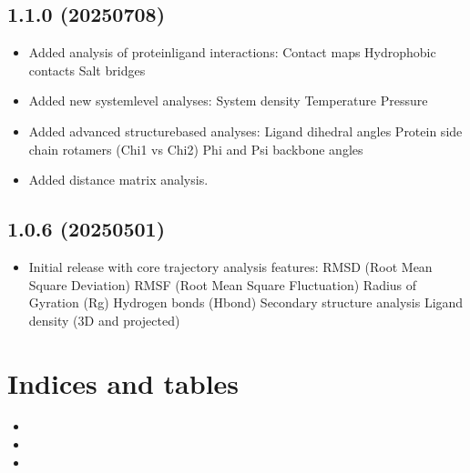 \documentclass[a4paper,10pt,english]{sphinxmanual}
\begin{document}
\section{1.1.0 (2025\sphinxhyphen{}07\sphinxhyphen{}08)}
\label{\detokenize{Changelog:id1}}\begin{itemize}
\item {} 
\sphinxAtStartPar
Added analysis of protein\sphinxhyphen{}ligand interactions:
\sphinxhyphen{} Contact maps
\sphinxhyphen{} Hydrophobic contacts
\sphinxhyphen{} Salt bridges

\item {} 
\sphinxAtStartPar
Added new system\sphinxhyphen{}level analyses:
\sphinxhyphen{} System density
\sphinxhyphen{} Temperature
\sphinxhyphen{} Pressure

\item {} 
\sphinxAtStartPar
Added advanced structure\sphinxhyphen{}based analyses:
\sphinxhyphen{} Ligand dihedral angles
\sphinxhyphen{} Protein side chain rotamers (Chi1 vs Chi2)
\sphinxhyphen{} Phi and Psi backbone angles

\item {} 
\sphinxAtStartPar
Added distance matrix analysis.

\end{itemize}


\section{1.0.6 (2025\sphinxhyphen{}05\sphinxhyphen{}01)}
\label{\detokenize{Changelog:id2}}\begin{itemize}
\item {} 
\sphinxAtStartPar
Initial release with core trajectory analysis features:
\sphinxhyphen{} RMSD (Root Mean Square Deviation)
\sphinxhyphen{} RMSF (Root Mean Square Fluctuation)
\sphinxhyphen{} Radius of Gyration (Rg)
\sphinxhyphen{} Hydrogen bonds (Hbond)
\sphinxhyphen{} Secondary structure analysis
\sphinxhyphen{} Ligand density (3D and projected)

\end{itemize}


\chapter{Indices and tables}
\label{\detokenize{index:indices-and-tables}}\begin{itemize}
\item {} 
\sphinxAtStartPar
{}

\item {} 
\sphinxAtStartPar
{}

\item {} 
\sphinxAtStartPar
{}

\end{itemize}



\renewcommand{\indexname}{Index}
\printindex
\end{document}
